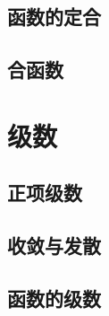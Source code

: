\documentclass[12pt,UTF8]{ctexbook}
\begin{document}
\section{函数的定合}
\section{合函数}

\chapter{级数}
\section{正项级数}
\section{收敛与发散}
\section{函数的级数}
\end{document}
